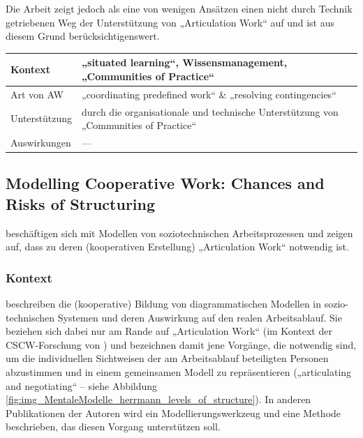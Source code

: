 Die Arbeit zeigt jedoch als eine von wenigen Ansätzen einen nicht durch Technik getriebenen Weg der Unterstützung von „Articulation Work“ auf und ist aus diesem Grund berücksichtigenswert.
\\[1em]
\begin{tabular}{| p{3cm} | p{10cm} |}
  \hline
  Kontext & „situated learning“, Wissensmanagement, „Communities of Practice“ \\ \hline
  Art von AW & „coordinating predefined work“ \& „resolving contingencies“ \\ \hline
  Unterstützung & durch die organisationale und technische Unterstützung von „Communities of Practice“ \\ \hline
  Auswirkungen & --- \\ \hline
\end{tabular}

\subsection{Modelling Cooperative Work: Chances and Risks of Structuring}
\label{sub:modelling_cooperative_work}

\citet{Herrmann02} beschäftigen sich mit Modellen von soziotechnischen Arbeitsprozessen und zeigen auf, dass zu deren (kooperativen Erstellung) „Articulation Work“ notwendig ist. 

\subsubsection{Kontext}

\citet{Herrmann02} beschreiben die (kooperative) Bildung von diagrammatischen Modellen in sozio-technischen Systemen und deren Auswirkung auf den realen Arbeitsablauf. Sie beziehen sich dabei nur am Rande auf „Articulation Work“ (im Kontext der \gls{CSCW}-Forschung von \citet{Schmidt92}) und bezeichnen damit jene Vorgänge, die notwendig sind, um die individuellen Sichtweisen der am Arbeitsablauf beteiligten Personen abzustimmen und in einem gemeinsamen Modell zu repräsentieren („articulating and negotiating“ -- siehe Abbildung \ref{fig:img_MentaleModelle_herrmann_levels_of_structure}). In anderen Publikationen der Autoren wird ein Modellierungswerkzeug \citep{Herrmann04a} und eine Methode \citep{Herrmann04} beschrieben, das diesen Vorgang unterstützen soll.

